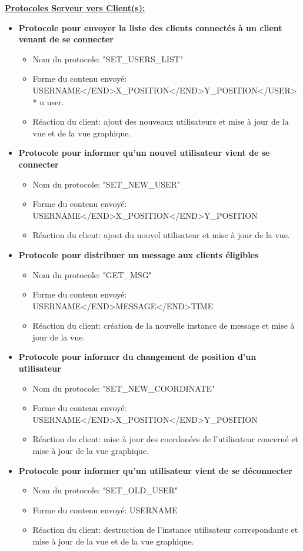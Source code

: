 \documentclass[a4paper,12pt]{report}
\begin{document}
    \bigbreak
    \underline{\textbf{Protocoles Serveur vers Client(s):}}
    \medbreak
    \begin{itemize}
      \item \textbf{Protocole pour envoyer la liste des clients connectés à un client venant de se connecter}
        \begin{itemize}
          \item Nom du protocole: "SET\_USERS\_LIST"
          \item Forme du contenu envoyé: USERNAME</END>X\_POSITION</END>Y\_POSITION</USER> * n user.
          \item Réaction du client: ajout des nouveaux utilisateurs et mise à jour de la vue et de la vue graphique.
        \end{itemize}
      \item \textbf{Protocole pour informer qu'un nouvel utilisateur vient de se connecter}
        \begin{itemize}
          \item Nom du protocole: "SET\_NEW\_USER"
          \item Forme du contenu envoyé: USERNAME</END>X\_POSITION</END>Y\_POSITION
          \item Réaction du client: ajout du nouvel utilisateur et mise à jour de la vue.
        \end{itemize}
      \item \textbf{Protocole pour distribuer un message aux clients éligibles}
        \begin{itemize}
          \item Nom du protocole: "GET\_MSG"
          \item Forme du contenu envoyé: USERNAME</END>MESSAGE</END>TIME
          \item Réaction du client: création de la nouvelle instance de message et mise à jour de la vue.
        \end{itemize}
      \item \textbf{Protocole pour informer du changement de position d'un utilisateur}
        \begin{itemize}
          \item Nom du protocole: "SET\_NEW\_COORDINATE"
          \item Forme du contenu envoyé: USERNAME</END>X\_POSITION</END>Y\_POSITION
          \item Réaction du client: mise à jour des coordonées de l'utilisateur concerné et mise à jour de la vue graphique.
        \end{itemize}
      \item \textbf{Protocole pour informer qu'un utilisateur vient de se déconnecter}
        \begin{itemize}
          \item Nom du protocole: "SET\_OLD\_USER"
          \item Forme du contenu envoyé: USERNAME
          \item Réaction du client: destruction de l'instance utilisateur correspondante et mise à jour de la vue et de la vue graphique.
        \end{itemize}
    \end{itemize}
\end{document}
